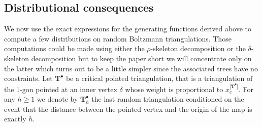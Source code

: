 \documentclass[10pt]{amsart}
\theoremstyle{definition}\newtheorem{defi}[theo]{Definition}\newtheorem{rema}[theo]{Remark}\newtheorem{exam}[theo]{Example}\newtheorem{exem}[theo]{Example}\newtheorem{nota}[theo]{Notation}
\begin{document}
\subsection{Distributional consequences}
We now use the exact expressions for the generating functions derived above to compute a few distributions on random Boltzmann triangulations. Those computations could be made using either the $\rho$-skeleton decomposition or the $\delta$-skeleton decomposition but to keep the paper short we will concentrate only on the latter which turns out to be a little simpler since the associated trees have no constraints. Let $ \mathbf{T}^{\bullet}$ be a critical pointed triangulation, that is a triangulation of the $1$-gon pointed at an inner vertex $\delta$ whose weight is proportional to $x_{c}^{| \mathbf{T}^\bullet|}$. For any $h \geq 1$ we denote by $  \mathbf{T}^{\bullet}_{h}$  the last random triangulation conditioned on the event that the distance between the pointed vertex and the origin of the map is exactly  $h$.
\end{document}
